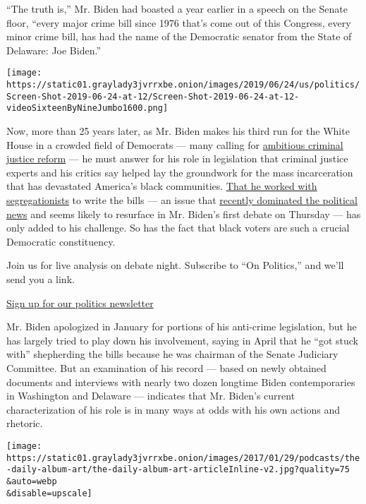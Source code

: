 ``The truth is,'' Mr. Biden had boasted a year earlier in a speech on
the Senate floor, ``every major crime bill since 1976 that's come out of
this Congress, every minor crime bill, has had the name of the
Democratic senator from the State of Delaware: Joe Biden.''

\texttt{[image: https://static01.graylady3jvrrxbe.onion/images/2019/06/24/us/politics/Screen-Shot-2019-06-24-at-12/Screen-Shot-2019-06-24-at-12-videoSixteenByNineJumbo1600.png]}

Now, more than 25 years later, as Mr. Biden makes his third run for the
White House in a crowded field of Democrats --- many calling for
\href{https://www.nytimes3xbfgragh.onion/2019/06/20/us/politics/booker-drugs-clemency.html}{ambitious
criminal justice reform} --- he must answer for his role in legislation
that criminal justice experts and his critics say helped lay the
groundwork for the mass incarceration that has devastated America's
black communities.
\href{https://www.nytimes3xbfgragh.onion/2019/06/21/us/politics/joe-biden-james-eastland.html?rref=collection\%2Fbyline\%2Flinda-qiu\&action=click\&contentCollection=undefined\&region=stream\&module=stream_unit\&version=latest\&contentPlacement=1\&pgtype=collection}{That
he worked with segregationists} to write the bills --- an issue that
\href{https://www.nytimes3xbfgragh.onion/2019/06/19/us/politics/biden-eastland.html}{recently
dominated the political news} and seems likely to resurface in Mr.
Biden's first debate on Thursday --- has only added to his challenge. So
has the fact that black voters are such a crucial Democratic
constituency.

Join us for live analysis on debate night. Subscribe to ``On Politics,''
and we'll send you a link.

\href{https://www.nytimes3xbfgragh.onion/newsletters/politics}{Sign up
for our politics newsletter}

Mr. Biden apologized in January for portions of his anti-crime
legislation, but he has largely tried to play down his involvement,
saying in April that he ``got stuck with'' shepherding the bills because
he was chairman of the Senate Judiciary Committee. But an examination of
his record --- based on newly obtained documents and interviews with
nearly two dozen longtime Biden contemporaries in Washington and
Delaware --- indicates that Mr. Biden's current characterization of his
role is in many ways at odds with his own actions and rhetoric.

\texttt{[image: https://static01.graylady3jvrrxbe.onion/images/2017/01/29/podcasts/the-daily-album-art/the-daily-album-art-articleInline-v2.jpg?quality=75\\\&auto=webp\\\&disable=upscale]}

